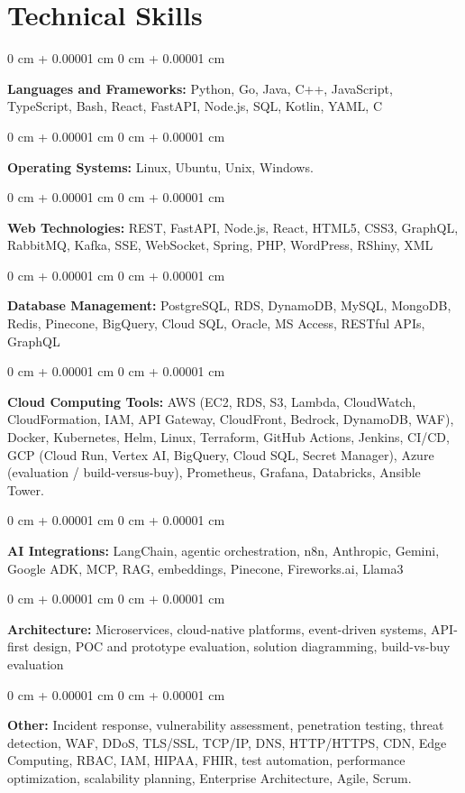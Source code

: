 \documentclass[10pt, letterpaper]{article}
\newenvironment{onecolentry}{
    \begin{adjustwidth}{
        0 cm + 0.00001 cm
    }{
        0 cm + 0.00001 cm
    }
}{
    \end{adjustwidth}
} %
\begin{document}
    \section{Technical Skills}
    \vspace{2 pt }
    \begin{onecolentry}
    \textbf{Languages and Frameworks:} Python, Go, Java, C++, JavaScript, TypeScript, Bash, React, FastAPI, Node.js, SQL, Kotlin, YAML, C
    \end{onecolentry}
    \begin{onecolentry}
        \textbf{Operating Systems:} Linux, Ubuntu, Unix, Windows.
    \end{onecolentry}
    \begin{onecolentry}
         \textbf{Web Technologies:} REST, FastAPI, Node.js, React, HTML5, CSS3, GraphQL, RabbitMQ, Kafka, SSE, WebSocket, Spring, PHP, WordPress, RShiny, XML
    \end{onecolentry}
    \begin{onecolentry}
        \textbf{Database Management:} PostgreSQL, RDS, DynamoDB, MySQL, MongoDB, Redis, Pinecone, BigQuery, Cloud SQL, Oracle, MS Access, RESTful APIs, GraphQL
    \end{onecolentry}
    \begin{onecolentry}
        \textbf{Cloud Computing Tools:}
AWS (EC2, RDS, S3, Lambda, CloudWatch, CloudFormation, IAM, API Gateway, CloudFront, Bedrock, DynamoDB, WAF), Docker, Kubernetes, Helm, Linux, Terraform, GitHub Actions, Jenkins, CI/CD, GCP (Cloud Run, Vertex AI, BigQuery, Cloud SQL, Secret Manager), Azure (evaluation / build-versus-buy), Prometheus, Grafana, Databricks, Ansible Tower.
    \end{onecolentry}
    \begin{onecolentry}
         \textbf{AI Integrations:} LangChain, agentic orchestration, n8n, Anthropic, Gemini, Google ADK, MCP, RAG, embeddings, Pinecone, Fireworks.ai, Llama3
    \end{onecolentry}
    \begin{onecolentry}
        \textbf{Architecture:} Microservices, cloud-native platforms, event-driven systems, API-first design, POC and prototype evaluation, solution diagramming, build-vs-buy evaluation
    \end{onecolentry}
        \begin{onecolentry}
     \textbf{Other:} Incident response, vulnerability assessment, penetration testing, threat detection, WAF, DDoS, TLS/SSL, TCP/IP, DNS, HTTP/HTTPS, CDN, Edge Computing, RBAC, IAM, HIPAA, FHIR, test automation, performance optimization, scalability planning, Enterprise Architecture, Agile, Scrum.
    \end{onecolentry}
\end{document}
